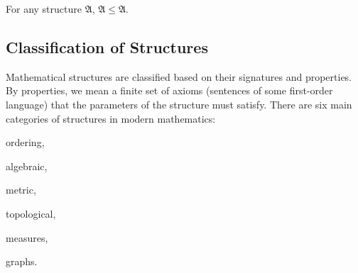 \begin{cor}
     \label{cor:every-structure-is-a-substructure-of-itself}
    For any structure \( \mathfrak{A} \), \( \mathfrak{A} \leq \mathfrak{A} \).
\end{cor}

\subsection*{Classification of Structures}
Mathematical structures are classified based on their signatures and properties. By properties, we mean a finite set of axioms (sentences of some first-order language)
that the parameters of the structure must satisfy. There are six main categories of structures in modern mathematics:
\begin{enumerate*}[label=(\roman*)]
    \item ordering,
    \item algebraic,
    \item metric,
    \item topological,
    \item measures,
    \item graphs.
\end{enumerate*}

